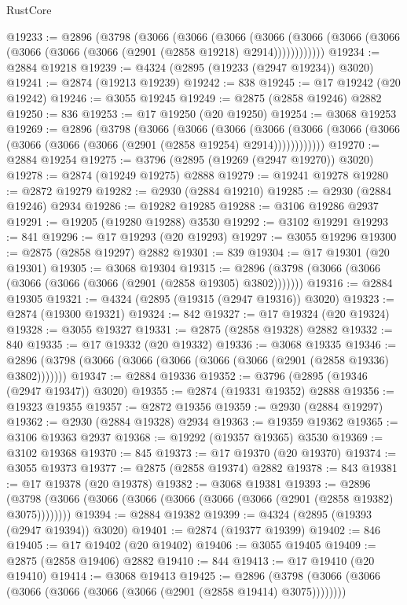 \begin{lexlean}{RustCore}
\begin{coremodule}
@19233 := @2896
    (@3798
      (@3066
        (@3066
          (@3066
            (@3066 (@3066 (@3066 (@3066 (@3066 (@3066 (@3066 (@2901 (@2858 @19218) @2914))))))))))))
@19234 := @2884 @19218
@19239 := @4324 (@2895 (@19233 (@2947 @19234)) @3020)
@19241 := @2874 (@19213 @19239)
@19242 := 838
@19245 := @17 @19242 (@20 @19242)
@19246 := @3055 @19245
@19249 := @2875 (@2858 @19246) @2882
@19250 := 836
@19253 := @17 @19250 (@20 @19250)
@19254 := @3068 @19253
@19269 := @2896
    (@3798
      (@3066
        (@3066
          (@3066
            (@3066 (@3066 (@3066 (@3066 (@3066 (@3066 (@3066 (@2901 (@2858 @19254) @2914))))))))))))
@19270 := @2884 @19254
@19275 := @3796 (@2895 (@19269 (@2947 @19270)) @3020)
@19278 := @2874 (@19249 @19275) @2888
@19279 := @19241 @19278
@19280 := @2872 @19279
@19282 := @2930 (@2884 @19210)
@19285 := @2930 (@2884 @19246) @2934
@19286 := @19282 @19285
@19288 := @3106 @19286 @2937
@19291 := @19205 (@19280 @19288) @3530
@19292 := @3102 @19291
@19293 := 841
@19296 := @17 @19293 (@20 @19293)
@19297 := @3055 @19296
@19300 := @2875 (@2858 @19297) @2882
@19301 := 839
@19304 := @17 @19301 (@20 @19301)
@19305 := @3068 @19304
@19315 := @2896 (@3798 (@3066 (@3066 (@3066 (@3066 (@3066 (@2901 (@2858 @19305) @3802)))))))
@19316 := @2884 @19305
@19321 := @4324 (@2895 (@19315 (@2947 @19316)) @3020)
@19323 := @2874 (@19300 @19321)
@19324 := 842
@19327 := @17 @19324 (@20 @19324)
@19328 := @3055 @19327
@19331 := @2875 (@2858 @19328) @2882
@19332 := 840
@19335 := @17 @19332 (@20 @19332)
@19336 := @3068 @19335
@19346 := @2896 (@3798 (@3066 (@3066 (@3066 (@3066 (@3066 (@2901 (@2858 @19336) @3802)))))))
@19347 := @2884 @19336
@19352 := @3796 (@2895 (@19346 (@2947 @19347)) @3020)
@19355 := @2874 (@19331 @19352) @2888
@19356 := @19323 @19355
@19357 := @2872 @19356
@19359 := @2930 (@2884 @19297)
@19362 := @2930 (@2884 @19328) @2934
@19363 := @19359 @19362
@19365 := @3106 @19363 @2937
@19368 := @19292 (@19357 @19365) @3530
@19369 := @3102 @19368
@19370 := 845
@19373 := @17 @19370 (@20 @19370)
@19374 := @3055 @19373
@19377 := @2875 (@2858 @19374) @2882
@19378 := 843
@19381 := @17 @19378 (@20 @19378)
@19382 := @3068 @19381
@19393 := @2896 (@3798 (@3066 (@3066 (@3066 (@3066 (@3066 (@3066 (@2901 (@2858 @19382) @3075))))))))
@19394 := @2884 @19382
@19399 := @4324 (@2895 (@19393 (@2947 @19394)) @3020)
@19401 := @2874 (@19377 @19399)
@19402 := 846
@19405 := @17 @19402 (@20 @19402)
@19406 := @3055 @19405
@19409 := @2875 (@2858 @19406) @2882
@19410 := 844
@19413 := @17 @19410 (@20 @19410)
@19414 := @3068 @19413
@19425 := @2896 (@3798 (@3066 (@3066 (@3066 (@3066 (@3066 (@3066 (@2901 (@2858 @19414) @3075))))))))

\end{coremodule}
\end{lexlean}
